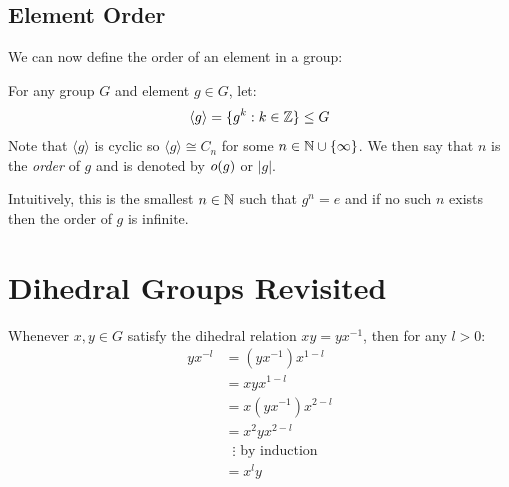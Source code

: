 \documentclass[../main.tex]{subfiles}
\begin{document}
\subsection{Element Order}
We can now define the order of an element in a group:
\begin{definition}
  For any group $G$ and element $g \in G$, let:
  \[
    \langle g \rangle = \{g^{k} : k \in \mathbb{Z}\} \leq G
  \]
  Note that $\langle g \rangle$ is cyclic so $\langle g \rangle \cong C_n$ for some $n \in \mathbb{N} \cup \{\infty\}$.
  We then say that $n$ is the \textit{order} of $g$ and is denoted by $o(g)$ or $|g|$.
\end{definition}
Intuitively, this is the smallest $n \in \mathbb{N}$ such that $g^{n} = e$ and if no such $n$ exists then the order of $g$ is infinite.
\section{Dihedral Groups Revisited}
Whenever $x, y \in G$ satisfy the dihedral relation $xy = yx^{-1}$, then for any $l > 0$:
\begin{align*}
  yx^{-l} &= (yx^{-1}) x^{1-l} \\
          &= xyx^{1-l} \\
          &= x(yx^{-1})x^{2-l} \\
          &= x^2yx^{2-l} \\
          &\;\; \vdots \text{ by induction}\\
          &= x^{l}y
\end{align*}
\end{document}
